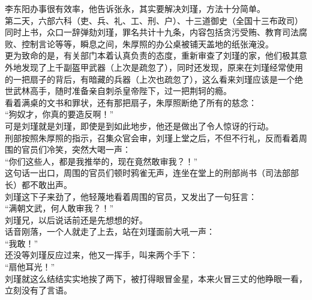 \begin{multicols}{\theparacolNo}
李东阳办事很有效率，他告诉张永，其实要解决刘瑾，方法十分简单。\\

第二天，六部六科（吏、兵、礼、工、刑、户）、十三道御史（全国十三布政司）同时上书，众口一辞弹劾刘瑾，罪名共计十九条，内容包括贪污受贿、教育司法腐败、控制言论等等，瞬息之间，朱厚照的办公桌被铺天盖地的纸张淹没。\\

更为致命的是，有关部门本着认真负责的态度，重新审查了刘瑾的家，他们极其意外地发现了上千副盔甲武器（上次是疏忽了），同时还发现，原来在刘瑾经常使用的一把扇子的背后，有暗藏的兵器（上次也疏忽了），这么看来刘瑾应该是一个绝世武林高手，随时准备亲自刺杀皇帝陛下，过一把荆轲的瘾。\\

看着满桌的文书和罪状，还有那把扇子，朱厚照断绝了所有的慈念：\\

“狗奴才，你真的要造反啊！”\\

可是刘瑾就是刘瑾，即使是到如此地步，他还是做出了令人惊讶的行动。\\

刑部按照朱厚照的指示，召集众官会审，刘瑾上堂之后，不但不行礼，反而看着周围的官员们冷笑，突然大喝一声：\\

“你们这些人，都是我推举的，现在竟然敢审我？！”\\

这句话一出口，周围的官员们顿时鸦雀无声，连坐在堂上的刑部尚书（司法部部长）都不敢出声。\\

刘瑾这下子来劲了，他轻蔑地看着周围的官员，又发出了一句狂言：\\

“满朝文武，何人敢审我？！”\\

刘瑾兄，以后说话前还是先想想的好。\\

话音刚落，一个人就走了上去，站在刘瑾面前大吼一声：\\

“我敢！”\\

还没等刘瑾反应过来，他又一挥手，叫来两个手下：\\

“扇他耳光！”\\

刘瑾就这么结结实实地挨了两下，被打得眼冒金星，本来火冒三丈的他睁眼一看，立刻没有了言语。\\


\end{multicols}
